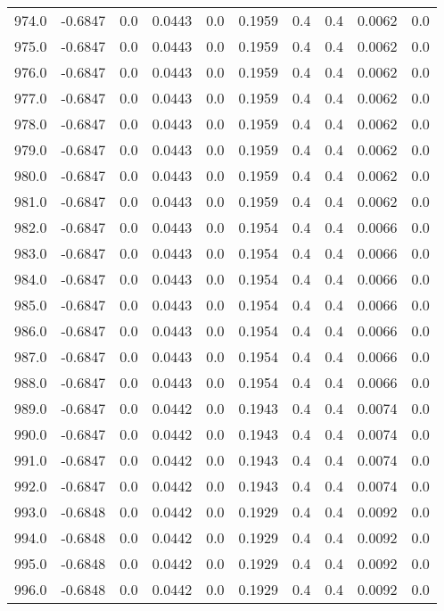 \begin{longtable}{lrrrrrrrrr}
974.0 & -0.6847 & 0.0 & 0.0443 & 0.0 & 0.1959 & 0.4 & 0.4 & 0.0062 & 0.0 \\
975.0 & -0.6847 & 0.0 & 0.0443 & 0.0 & 0.1959 & 0.4 & 0.4 & 0.0062 & 0.0 \\
976.0 & -0.6847 & 0.0 & 0.0443 & 0.0 & 0.1959 & 0.4 & 0.4 & 0.0062 & 0.0 \\
977.0 & -0.6847 & 0.0 & 0.0443 & 0.0 & 0.1959 & 0.4 & 0.4 & 0.0062 & 0.0 \\
978.0 & -0.6847 & 0.0 & 0.0443 & 0.0 & 0.1959 & 0.4 & 0.4 & 0.0062 & 0.0 \\
979.0 & -0.6847 & 0.0 & 0.0443 & 0.0 & 0.1959 & 0.4 & 0.4 & 0.0062 & 0.0 \\
980.0 & -0.6847 & 0.0 & 0.0443 & 0.0 & 0.1959 & 0.4 & 0.4 & 0.0062 & 0.0 \\
981.0 & -0.6847 & 0.0 & 0.0443 & 0.0 & 0.1959 & 0.4 & 0.4 & 0.0062 & 0.0 \\
982.0 & -0.6847 & 0.0 & 0.0443 & 0.0 & 0.1954 & 0.4 & 0.4 & 0.0066 & 0.0 \\
983.0 & -0.6847 & 0.0 & 0.0443 & 0.0 & 0.1954 & 0.4 & 0.4 & 0.0066 & 0.0 \\
984.0 & -0.6847 & 0.0 & 0.0443 & 0.0 & 0.1954 & 0.4 & 0.4 & 0.0066 & 0.0 \\
985.0 & -0.6847 & 0.0 & 0.0443 & 0.0 & 0.1954 & 0.4 & 0.4 & 0.0066 & 0.0 \\
986.0 & -0.6847 & 0.0 & 0.0443 & 0.0 & 0.1954 & 0.4 & 0.4 & 0.0066 & 0.0 \\
987.0 & -0.6847 & 0.0 & 0.0443 & 0.0 & 0.1954 & 0.4 & 0.4 & 0.0066 & 0.0 \\
988.0 & -0.6847 & 0.0 & 0.0443 & 0.0 & 0.1954 & 0.4 & 0.4 & 0.0066 & 0.0 \\
989.0 & -0.6847 & 0.0 & 0.0442 & 0.0 & 0.1943 & 0.4 & 0.4 & 0.0074 & 0.0 \\
990.0 & -0.6847 & 0.0 & 0.0442 & 0.0 & 0.1943 & 0.4 & 0.4 & 0.0074 & 0.0 \\
991.0 & -0.6847 & 0.0 & 0.0442 & 0.0 & 0.1943 & 0.4 & 0.4 & 0.0074 & 0.0 \\
992.0 & -0.6847 & 0.0 & 0.0442 & 0.0 & 0.1943 & 0.4 & 0.4 & 0.0074 & 0.0 \\
993.0 & -0.6848 & 0.0 & 0.0442 & 0.0 & 0.1929 & 0.4 & 0.4 & 0.0092 & 0.0 \\
994.0 & -0.6848 & 0.0 & 0.0442 & 0.0 & 0.1929 & 0.4 & 0.4 & 0.0092 & 0.0 \\
995.0 & -0.6848 & 0.0 & 0.0442 & 0.0 & 0.1929 & 0.4 & 0.4 & 0.0092 & 0.0 \\
996.0 & -0.6848 & 0.0 & 0.0442 & 0.0 & 0.1929 & 0.4 & 0.4 & 0.0092 & 0.0 \\

\end{longtable}
